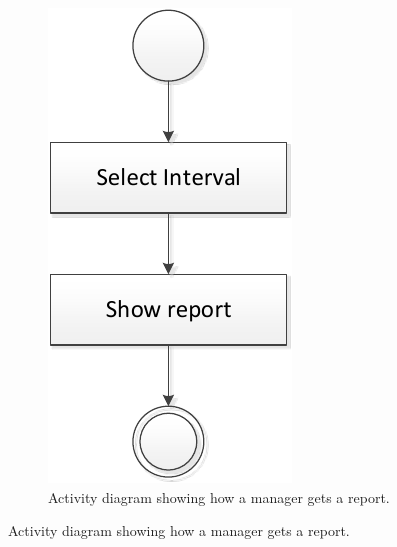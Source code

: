 \begin{figure}[H]
\begin{subfigure}[b]{0.225\textwidth}
	\includegraphics[width=\textwidth]{img/activity_diagrams/Show_report}
	\caption{Activity diagram showing how a manager gets a report.}
	\end{subfigure}
\end{figure}